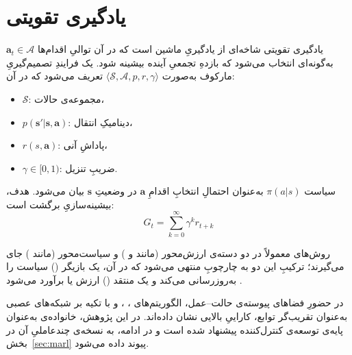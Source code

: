 %

\section{یادگیری تقویتی}\label{sec:rl}

یادگیری تقویتی
 شاخه‌ای از یادگیریِ ماشین است که در آن توالیِ اقدام‌ها $\boldsymbol{a}_t\in\mathcal{A}$ به‌گونه‌ای انتخاب می‌شود که بازدهِ تجمعیِ آینده بیشینه شود. یک فرایندِ تصمیم‌گیریِ مارکوف
  به‌صورت $\langle\mathcal{S},\mathcal{A},p,r,\gamma\rangle$ تعریف می‌شود که در آن:
\begin{itemize}
	\item $\mathcal{S}$:
	 مجموعه‌ی حالات،
	\item $p(\boldsymbol{s}'|\boldsymbol{s},\boldsymbol{a})$:
	 دینامیکِ انتقال،
	\item $r(s,\boldsymbol{a})$:
	 پاداشِ آنی،
	\item $\gamma\in[0,1)$:
	 ضریبِ تنزیل.
\end{itemize}
\noindent
سیاست
 $\pi(a|s)$ به‌عنوان احتمالِ انتخابِ اقدامِ $\boldsymbol{a}$ در وضعیتِ $\boldsymbol{s}$ بیان می‌شود. هدف، بیشینه‌سازیِ برگشت
 است:
 \begin{equation}
 	G_t=\sum_{k=0}^{\infty}\gamma^k r_{t+k}
 \end{equation}
 
 روش‌های  معمولاً در دو دسته‌ی {ارزش‌محور} (مانند  و ) و {سیاست‌محور} (مانند ) جای می‌گیرند؛ ترکیبِ این دو به چارچوبِ  منتهی می‌شود که در آن، یک بازیگر () سیاست را به‌روزرسانی می‌کند و یک منتقد () ارزش یا  برآورد می‌شود
  \cite{SuttonBarto2018}.

در حضورِ فضاهای پیوسته‌ی حالت–عمل، الگوریتم‌های  ، ،  و  با تکیه بر شبکه‌های عصبی به‌عنوان تقریب‌گر توابع، کاراییِ بالایی نشان داده‌اند. در این پژوهش، خانواده‌ی  به‌عنوان پایه‌ی توسعه‌ی کنترل‌کننده پیشنهاد شده‌ است و در ادامه، به نسخه‌ی چندعاملیِ آن در بخش~\ref{sec:marl} پیوند داده می‌شود.
